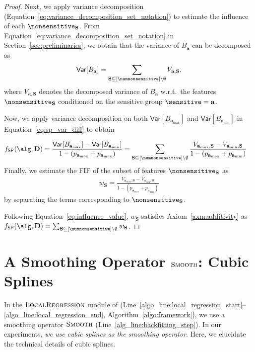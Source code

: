 \begin{proof}

Next, we apply variance decomposition (Equation~\eqref{eq:variance_decomposition_set_notation}) to estimate the influence of each $ \nonsensitive_{\mathbf{S}} $. From Equation~\eqref{eq:variance_decomposition_set_notation} in Section~\ref{sec:preliminaries}, we obtain that the variance of $ B_{\mathbf{a}} $ can be decomposed as 
\[ \mathsf{Var}[B_\mathbf{a}] = \sum_{\mathbf{S} \subseteq [\numnonsensitive] \setminus \emptyset} V_{\mathbf{a}, \mathbf{S}},\] 
where $ V_{\mathbf{a}, \mathbf{S}} $ denotes the decomposed variance of $ B_\mathbf{a} $ w.r.t.\ the features $ \nonsensitive_{\mathbf{S}} $ conditioned on the sensitive group $ \sensitive = \mathbf{a} $. 

Now, we apply variance decomposition on both $ \mathsf{Var}[B_{\mathbf{a}_{\max}}] $ and $ \mathsf{Var}[B_{\mathbf{a}_{\min}}] $ in Equation~\ref{eq:sp_var_diff} to obtain

\begin{align}
f_{\mathsf{SP}}(\alg, \mathbf{D}) & = \frac{\mathsf{Var}[B_{\mathbf{a}_{\max}}] - \mathsf{Var}[B_{\mathbf{a}_{\min}}]}{1 - (p_{\mathbf{a}_{\max}} + p_{\mathbf{a}_{\max}})}= \sum_{\mathbf{S} \subseteq [\numnonsensitive] \setminus \emptyset} \frac{V_{\mathbf{a}_{\max}, \mathbf{S}} - V_{\mathbf{a}_{\min}, \mathbf{S}}}{1 - (p_{\mathbf{a}_{\max}} + p_{\mathbf{a}_{\min}})} \label{eq:influence_value}
\end{align}
Finally, we estimate  the FIF of the subset of features $ \nonsensitive_{\mathbf{S}}  $ as 
\begin{align}
	w_{\mathbf{S}}  = \frac{V_{\mathbf{a}_{\max}, \mathbf{S}} - V_{\mathbf{a}_{\min}, \mathbf{S}}}{1 - (p_{\mathbf{a}_{\max}} + p_{\mathbf{a}_{\min}})}
\end{align} 
by separating the terms corresponding to $ \nonsensitive_{\mathbf{S}} $.

Following Equation~\eqref{eq:influence_value}, $	w_{\mathbf{S}} $ satisfies Axiom~\ref{axm:additivity} as $f_{\mathsf{SP}}(\alg, \mathbf{D}) = \sum_{\mathbf{S} \subseteq [\numnonsensitive] \setminus \emptyset} w_{\mathbf{S}} $.
\end{proof}


\section{A Smoothing Operator $\textsc{Smooth}$: Cubic Splines}
\label{sec:smoothing} 
In the $\textsc{LocalRegression}$ module of \framework{} (Line~\ref{algo_line:local_regression_start}--\ref{algo_line:local_regression_end}, Algorithm~\ref{algo:framework}), we use a smoothing operator $\textsc{Smooth}$ (Line~\ref{alg_line:backfitting_step}). In our experiments, \textit{we use cubic splines as the smoothing operator}. Here, we elucidate the technical details of cubic splines.

